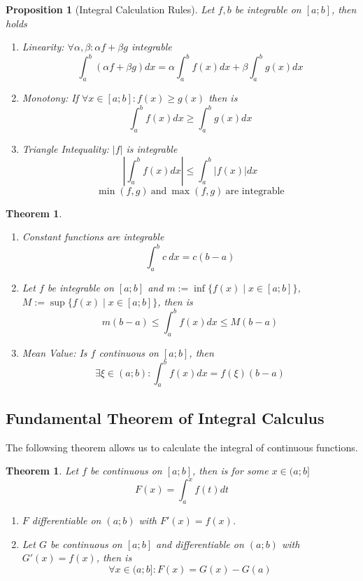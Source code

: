 \documentclass[english,titlepage]{uzhpub}
\theoremstyle{definition}
\theoremstyle{plain}
\newtheorem{proposition}[definition]{Proposition}
\newtheorem{theorem}[definition]{Theorem} %
\theoremstyle{remark}
\theoremstyle{example}
\begin{document}
   \begin{proposition}[Integral Calculation Rules]\label{pro:integra_calc_rules}
      Let \(f, b\) be integrable on \([a;b]\), then holds
      \begin{enumerate}[label=\roman*, align=Center]
         \item Linearity: \(\forall \alpha, \beta: \alpha f + \beta g\) integrable
            \[\int_a^b(\alpha f + \beta g)dx = \alpha \int_a^b f(x) dx + \beta \int_a^b g(x) dx\]
         \item Monotony: If \(\forall x \in [a; b]: f(x) \geq g(x)\) then is
            \[\int_a^b f(x) dx \geq \int_a^b g(x)dx\]
         \item Triangle Intequality: \(|f|\) is integrable
            \[\left|\int_a^b f(x) dx\right| \leq \int_a^b |f(x)| dx\]
            \[\min(f, g)~\text{and}~\max(f, g)~\text{are integrable}\]
      \end{enumerate}
   \end{proposition}

   \begin{theorem}\label{thm:conesq_calc_rules}
      \begin{enumerate}[label=\roman*, align=Center]
         \item Constant functions are integrable
            \[\int_a^b c~dx = c (b - a)\]
         \item Let \(f\) be integrable on \([a; b]\) and \(m := \inf\{f(x) \mid x \in [a;b]\}\), \(M := \sup\{f(x) \mid x \in [a;b]\}\), then is
            \[m(b-a) \leq \int_a^b f(x) dx \leq M (b-a)\]
         \item Mean Value: Is \(f\) continuous on \([a;b]\), then
            \[\exists \xi \in (a; b): \int_a^b f(x)dx = f(\xi)(b-a)\]
      \end{enumerate}
   \end{theorem}

   \begin{center}
      
      
      
   \end{center}

   \subsection{Fundamental Theorem of Integral Calculus}
   The followsing theorem allows us to calculate the integral of continuous functions.
   \begin{theorem}\label{thm:fund_thm_integ}
      Let \(f\) be continuous on \([a;b]\), then is for some \(x \in (a; b]\)
      \[F(x) = \int_a^x f(t)dt\]
      \begin{enumerate}[label=\roman*, align=Center]
         \item \(F\) differentiable on \((a;b)\) with \(F'(x) = f(x)\).
         \item Let \(G\) be continuous on \([a;b]\) and differentiable on \((a;b)\) with \(G'(x) = f(x)\), then is
            \[\forall x \in (a; b]: F(x) = G(x) - G(a)\]
      \end{enumerate}
   \end{theorem}
\end{document}
